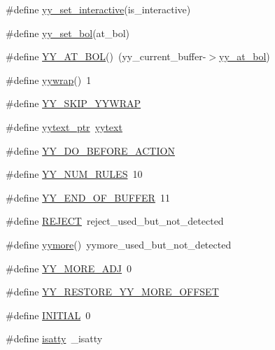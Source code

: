 \begin{DoxyCompactItemize}
\item 
\#define \mbox{\hyperlink{expr-lex_8cpp_ac56eb96366c08862bf0efe5d83d1fc4c}{yy\+\_\+set\+\_\+interactive}}(is\+\_\+interactive)
\item 
\#define \mbox{\hyperlink{expr-lex_8cpp_a12e30d13a76a94e78010db9996d39c50}{yy\+\_\+set\+\_\+bol}}(at\+\_\+bol)
\item 
\#define \mbox{\hyperlink{expr-lex_8cpp_a71ca89b3656acd0552f14949a571560b}{Y\+Y\+\_\+\+A\+T\+\_\+\+B\+OL}}()~(yy\+\_\+current\+\_\+buffer-\/$>$\mbox{\hyperlink{expr-lex_8cpp_adef6ed71d4cd59407dc44578f94e5fec}{yy\+\_\+at\+\_\+bol}})
\item 
\#define \mbox{\hyperlink{expr-lex_8cpp_ade1e2db9970733fbc3d9fecd09ce9771}{yywrap}}()~1
\item 
\#define \mbox{\hyperlink{expr-lex_8cpp_ae1ef5933028cbc587d31328e53d11a99}{Y\+Y\+\_\+\+S\+K\+I\+P\+\_\+\+Y\+Y\+W\+R\+AP}}
\item 
\#define \mbox{\hyperlink{expr-lex_8cpp_a790a191a93ef4d3b8c0bb43fd7480052}{yytext\+\_\+ptr}}~\mbox{\hyperlink{expr_node_8cpp_ad9264b77d56b6971f29739e2bda77f51}{yytext}}
\item 
\#define \mbox{\hyperlink{expr-lex_8cpp_acc3486d769af4e4b2820346a0093cc79}{Y\+Y\+\_\+\+D\+O\+\_\+\+B\+E\+F\+O\+R\+E\+\_\+\+A\+C\+T\+I\+ON}}
\item 
\#define \mbox{\hyperlink{expr-lex_8cpp_ae558785bb896e090901c2b905f6790c6}{Y\+Y\+\_\+\+N\+U\+M\+\_\+\+R\+U\+L\+ES}}~10
\item 
\#define \mbox{\hyperlink{expr-lex_8cpp_ab2708fd42cff29ce6a0a52b91bea40d1}{Y\+Y\+\_\+\+E\+N\+D\+\_\+\+O\+F\+\_\+\+B\+U\+F\+F\+ER}}~11
\item 
\#define \mbox{\hyperlink{expr-lex_8cpp_a835f10dd1ab4bf9a80c4cd80ee6e3058}{R\+E\+J\+E\+CT}}~reject\+\_\+used\+\_\+but\+\_\+not\+\_\+detected
\item 
\#define \mbox{\hyperlink{expr-lex_8cpp_a745d37b5e002b2e5f93ad42ea7b554be}{yymore}}()~yymore\+\_\+used\+\_\+but\+\_\+not\+\_\+detected
\item 
\#define \mbox{\hyperlink{expr-lex_8cpp_a68792d73820bc46a71d3d4e613f0b977}{Y\+Y\+\_\+\+M\+O\+R\+E\+\_\+\+A\+DJ}}~0
\item 
\#define \mbox{\hyperlink{expr-lex_8cpp_a56858d18c7eda4f53664496ef566f651}{Y\+Y\+\_\+\+R\+E\+S\+T\+O\+R\+E\+\_\+\+Y\+Y\+\_\+\+M\+O\+R\+E\+\_\+\+O\+F\+F\+S\+ET}}
\item 
\#define \mbox{\hyperlink{expr-lex_8cpp_aa3d063564f6ab16f6d408b8369d0e9ff}{I\+N\+I\+T\+I\+AL}}~0
\item 
\#define \mbox{\hyperlink{expr-lex_8cpp_aef88e7abfad3a0a8812ec4a04ea1de6b}{isatty}}~\+\_\+isatty

\end{DoxyCompactItemize}
